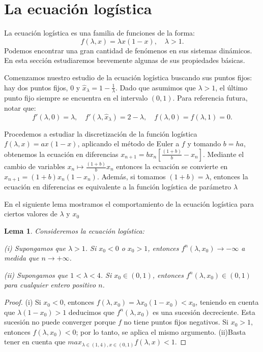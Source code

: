 \documentclass[12pt,a4paper]{report}
\newtheorem{lema}{Lema}[section]
\theoremstyle{definition}
\begin{document}
\section{La ecuación logística}\label{sec:logistic}

La ecuación logística es una familia de funciones de la forma:
$$
f(\lambda, x) = \lambda x (1 - x), \quad \lambda > 1.
$$
Podemos encontrar una gran cantidad de fenómenos en sus sistemas dinámicos. En esta sección estudiaremos brevemente algunas de sus propiedades básicas.

Comenzamos nuestro estudio de la ecuación logística buscando sus puntos fijos: hay dos puntos fijos, $0$ y $\hat{x}_\lambda = 1 - \frac{1}{\lambda}$. Dado que asumimos que $\lambda > 1$, el último punto fijo siempre se encuentra en el intervalo $(0, 1)$. Para referencia futura, notar que:
$$
f'(\lambda, 0) = \lambda, \quad f'(\lambda, \hat{x}_\lambda) = 2 - \lambda, \quad f(\lambda, 0) = f(\lambda, 1) = 0.
$$

Procedemos a estudiar la discretización de la función logística $f(\lambda,x) = ax(1-x)$, aplicando el método de Euler a $f$ y tomando $b = ha$, obtenemos la ecuación en diferencias 
$x_{n+1} = b x_n \left[\frac{(1 + b)}{b} - x_n \right]$. Mediante el cambio de variables $x_n \mapsto \frac{(1 + b)}{b} x_n$ entonces la ecuación se convierte en $
x_{n+1} = (1 + b) x_n (1 - x_n)$. Además, si tomamos $(1 + b) = \lambda$, entonces la ecuación en diferencias es equivalente a la función logística de parámetro $\lambda$

 En el siguiente lema mostramos el comportamiento de la ecuación logística para ciertos valores de $\lambda$ y $x_0$

\begin{lema}
Consideremos la ecuación logística:

(i) Supongamos que $\lambda > 1$. Si $x_0 < 0$ o $x_0 > 1$, entonces $f^n(\lambda, x_0) \to -\infty$ a medida que $n \to +\infty$.

(ii) Supongamos que $1 < \lambda < 4$. Si $x_0 \in (0, 1)$, entonces $f^n(\lambda, x_0) \in (0, 1)$ para cualquier entero positivo $n$.
\end{lema}

\begin{proof}

(i) Si $x_0 < 0$, entonces $f(\lambda, x_0) =  \lambda x_0 (1 - x_0) < x_0$, teniendo en cuenta que $\lambda(1 - x_0) > 1 $ deducimos que $f^n(\lambda, x_0)$ es una sucesión decreciente. Esta sucesión no puede converger porque $f$ no tiene puntos fijos negativos. Si $x_0 > 1$, entonces $f(\lambda, x_0) < 0$; por lo tanto, se aplica el mismo argumento. (ii)Basta tener en cuenta que $max_{\lambda \in (1,4), x\in (0,1)}{f(\lambda, x)} < 1$.
\end{proof}
\end{document}
